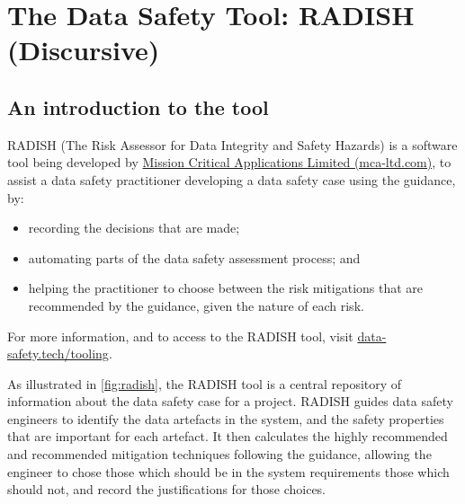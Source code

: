 %
%
\chapter{The Data Safety Tool: RADISH (Discursive)} \label{bkm:radish}

\section{An introduction to the tool}
RADISH (The Risk Assessor for Data Integrity and Safety Hazards) is a software tool being developed by \href{https://mca-ltd.com/}{Mission Critical Applications Limited (mca-ltd.com)}, to assist a data safety practitioner developing a data safety case using the guidance, by:
\begin{itemize}
  \item recording the decisions that are made;
  \item automating parts of the data safety assessment process; and
  \item helping the practitioner to choose between the risk mitigations that are recommended by the guidance, given the nature of each risk.
\end{itemize}

For more information, and to access to the RADISH tool, visit \href{https://data-safety.tech/tooling}{data-safety.tech/tooling}.

As illustrated in \autoref{fig:radish}, the RADISH tool is a central repository of information about the data safety case for a project. RADISH guides data safety engineers to identify the data artefacts in the system, and the safety properties that are important for each artefact. It then calculates the highly recommended and recommended mitigation techniques following the guidance, allowing the engineer to chose those which should be in the system requirements those which should not, and record the justifications for those choices.

